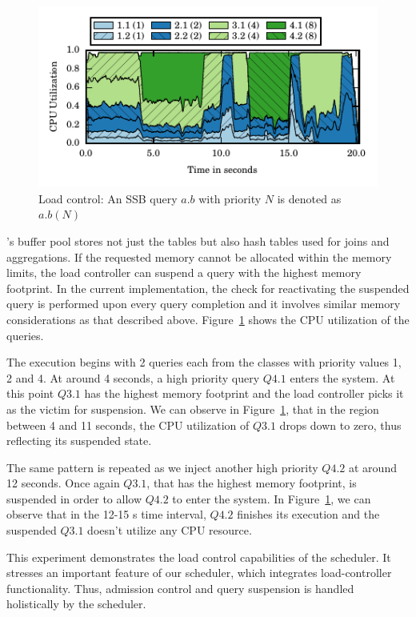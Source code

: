 \begin{figure}[t]
	\centering
	\includegraphics[width=\columnwidth]{figures/load-control-cpu-util.pdf}
	\caption{Load control: An SSB query $a.b$ with priority $N$ is denoted as $a.b (N)$}
	\label{fig:load-control-cpu-util}
\end{figure}

\sys{}'s buffer pool stores not just the tables but also hash tables used for joins and aggregations.
If the requested memory cannot be allocated within the memory limits, the load controller can suspend a query with the highest memory footprint. 
In the current implementation, the check for reactivating the suspended query is performed upon every query completion and it involves similar memory considerations as that described above. 
Figure~\ref{fig:load-control-cpu-util} shows the CPU utilization of the queries.

The execution begins with 2 queries each from the classes with priority values 1, 2 and 4.
At around 4 seconds, a high priority query $Q4.1$ enters the system.
At this point $Q3.1$ has the highest memory footprint and the load controller
picks it as the victim for suspension.
We can observe in Figure~\ref{fig:load-control-cpu-util}, that in the region between 4
and 11 seconds, the CPU utilization of $Q3.1$ drops down to zero, thus
reflecting its suspended state.

The same pattern is repeated as we inject another high priority $Q4.2$ at around 12 seconds.
Once again $Q3.1$, that has the highest memory footprint, is suspended in order to allow $Q4.2$ to enter the system. 
In Figure~\ref{fig:load-control-cpu-util}, we can observe that in the 12-15 s time interval, $Q4.2$ finishes its execution and the suspended $Q3.1$ doesn't utilize any CPU resource.

This experiment demonstrates the load control capabilities of the \sys{}
scheduler. 
It stresses an important feature of our scheduler, which integrates load-controller functionality. %
Thus, admission control and query suspension is handled holistically by the scheduler. 